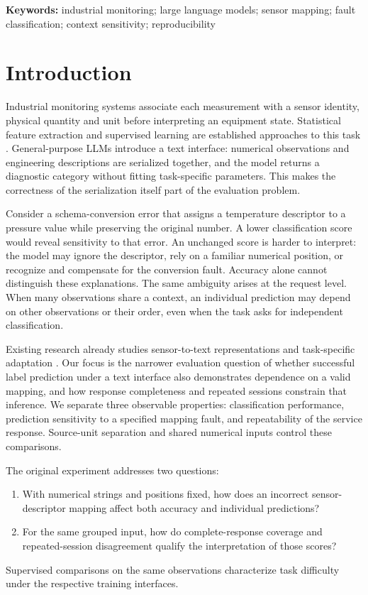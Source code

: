 \documentclass[11pt,a4paper]{article}
\begin{document}
\noindent\textbf{Keywords:} industrial monitoring; large language models; sensor mapping; fault classification; context sensitivity; reproducibility

\section{Introduction}
Industrial monitoring systems associate each measurement with a sensor identity, physical quantity and unit before interpreting an equipment state. Statistical feature extraction and supervised learning are established approaches to this task \citep{lei2020applications,zhao2019deep}. General-purpose LLMs introduce a text interface: numerical observations and engineering descriptions are serialized together, and the model returns a diagnostic category without fitting task-specific parameters. This makes the correctness of the serialization itself part of the evaluation problem.

Consider a schema-conversion error that assigns a temperature descriptor to a pressure value while preserving the original number. A lower classification score would reveal sensitivity to that error. An unchanged score is harder to interpret: the model may ignore the descriptor, rely on a familiar numerical position, or recognize and compensate for the conversion fault. Accuracy alone cannot distinguish these explanations. The same ambiguity arises at the request level. When many observations share a context, an individual prediction may depend on other observations or their order, even when the task asks for independent classification.

Existing research already studies sensor-to-text representations and task-specific adaptation \citep{qaid2026explainable,zheng2024empirical}. Our focus is the narrower evaluation question of whether successful label prediction under a text interface also demonstrates dependence on a valid mapping, and how response completeness and repeated sessions constrain that inference. We separate three observable properties: classification performance, prediction sensitivity to a specified mapping fault, and repeatability of the service response. Source-unit separation and shared numerical inputs control these comparisons.

The original experiment addresses two questions:
\begin{enumerate}
\item With numerical strings and positions fixed, how does an incorrect sensor-descriptor mapping affect both accuracy and individual predictions?
\item For the same grouped input, how do complete-response coverage and repeated-session disagreement qualify the interpretation of those scores?
\end{enumerate}
Supervised comparisons on the same observations characterize task difficulty under the respective training interfaces.
\end{document}
